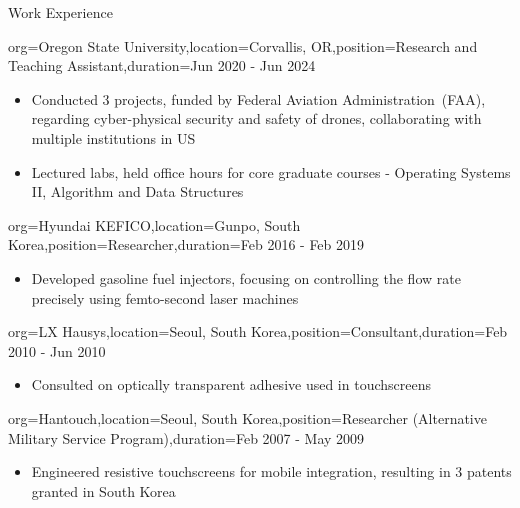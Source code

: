 \documentclass{resume}
\begin{document}
\begin{ResumeSection}{Work Experience}
    \begin{ResumeSubsection}{org=Oregon State University,location={Corvallis, OR},position={Research and Teaching Assistant},duration=Jun 2020 - Jun 2024}
        \begin{itemize}
            \item Conducted 3 projects, funded by Federal Aviation Administration~(FAA), regarding cyber-physical security and safety of drones, collaborating with multiple institutions in US
            \item Lectured labs, held office hours for core graduate courses - Operating Systems II, Algorithm and Data Structures
        \end{itemize}
    \end{ResumeSubsection}

    \begin{ResumeSubsection}{org={Hyundai KEFICO},location={Gunpo, South Korea},position={Researcher},duration={Feb 2016 - Feb 2019}}
        \begin{itemize}
            \item Developed gasoline fuel injectors, focusing on controlling the flow rate precisely using femto-second laser machines
        \end{itemize}
    \end{ResumeSubsection}

    \begin{ResumeSubsection}{org={LX Hausys},location={Seoul, South Korea},position={Consultant},duration={Feb 2010 - Jun 2010}}
        \begin{itemize}
            \item Consulted on optically transparent adhesive used in touchscreens
        \end{itemize}
    \end{ResumeSubsection}

    \begin{ResumeSubsection}{org={Hantouch},location={Seoul, South Korea},position={Researcher (Alternative Military Service Program)},duration={Feb 2007 - May 2009}}
        \begin{itemize}
            \item Engineered resistive touchscreens for mobile integration, resulting in 3 patents granted in South Korea
        \end{itemize}

    \end{ResumeSubsection}
\end{ResumeSection}
\end{document}
